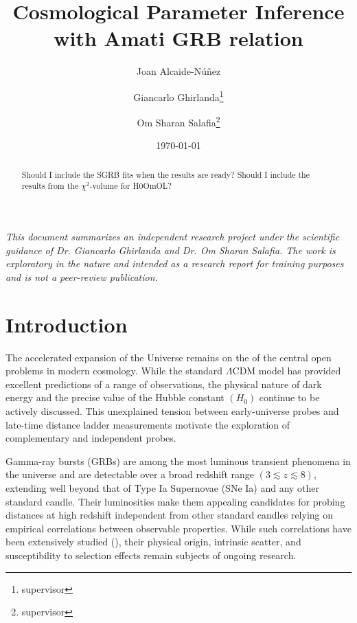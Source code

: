 \documentclass[
    aps,
    prd,
    twocolumn,
    nofootinbib,
    floatfix,
    superscriptaddress
]{revtex4-2}
\begin{document}
\title{Cosmological Parameter Inference with Amati GRB relation}

\author{Joan Alcaide-Núñez}
\author{Giancarlo Ghirlanda\thanks{supervisor}}
\author{Om Sharan Salafia\thanks{supervisor}}

\date{\today}

\maketitle

\begin{abstract}
Should I include the SGRB fits when the results are ready? Should I include the results from the $\chi^2$-volume for H0OmOL?
\end{abstract}


\vspace{1em}

\textit{This document summarizes an independent research project under the scientific guidance of Dr. Giancarlo Ghirlanda and Dr. Om Sharan Salafia. The work is exploratory in the nature and intended as a research report for training purposes and is not a peer-review publication.
}

\section{Introduction}

The accelerated expansion of the Universe remains on the of the central open problems in modern cosmology. While the standard $\Lambda$CDM model has provided excellent predictions of a range of observations, the physical nature of dark energy and the precise value of the Hubble constant $(H_0)$ continue to be actively discussed. This unexplained tension between early-universe probes and late-time distance ladder measurements motivate the exploration of complementary and independent probes.

Gamma-ray bursts (GRBs) are among the most luminous transient phenomena in the universe and are detectable over a broad redshift range $(3\lesssim z \lesssim 8)$, extending well beyond that of Type Ia Supernovae (SNe Ia) and any other standard candle. Their luminosities make them appealing candidates for probing distances at high redshift independent from other standard candles relying on empirical correlations between observable properties. While such correlations have been extensively studied (\cite{ghirlanda2006}), their physical origin, intrinsic scatter, and susceptibility to selection effects remain subjects of ongoing research.
\end{document}
